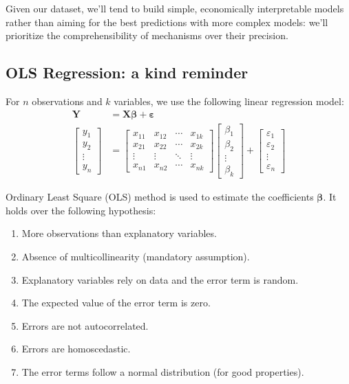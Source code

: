 Given our dataset, we'll tend to build simple, economically interpretable models rather than aiming for the best predictions with more complex models: we'll prioritize the comprehensibility of mechanisms over their precision.

\subsection{OLS Regression: a kind reminder}
For $n$ observations and $k$ variables, we use the following linear regression model:
\begin{align*}
    \boldsymbol{Y} & = \boldsymbol{X} \boldsymbol{\beta} + \boldsymbol{\varepsilon} \\
    \begin{bmatrix} 
        y_1 \\ y_2 \\ \vdots \\ y_n 
        \end{bmatrix} & = \begin{bmatrix}
        x_{11} & x_{12} & \cdots & x_{1k} \\ 
        x_{21} & x_{22} & \cdots & x_{2k} \\ 
        \vdots & \vdots & \ddots & \vdots \\ 
        x_{n1} & x_{n2} & \cdots & x_{nk} 
        \end{bmatrix} \begin{bmatrix}
        \beta_1 \\ \beta_2 \\ \vdots \\ \beta_k 
        \end{bmatrix} + \begin{bmatrix} 
        \varepsilon_1 \\ \varepsilon_2 \\ \vdots \\ \varepsilon_n \end{bmatrix}
\end{align*}

Ordinary Least Square (OLS) method is used to estimate the coefficients $\boldsymbol{\beta}$. It holds over the following hypothesis:
\begin{enumerate}
    \item More observations than explanatory variables.
    \item Absence of multicollinearity (mandatory assumption).
    \item Explanatory variables rely on data and the error term is random.
    \item The expected value of the error term is zero.
    \item Errors are not autocorrelated.
    \item Errors are homoscedastic.
    \item The error terms follow a normal distribution (for good properties).
\end{enumerate}

